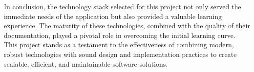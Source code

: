 In conclusion, the technology stack selected for this project not only served the immediate needs of the application but also provided a valuable learning experience. The maturity of these technologies, combined with the quality of their documentation, played a pivotal role in overcoming the initial learning curve. This project stands as a testament to the effectiveness of combining modern, robust technologies with sound design and implementation practices to create scalable, efficient, and maintainable software solutions.





